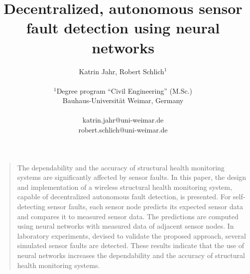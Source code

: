 \documentclass[12pt]{article}
\title{\textbf{ \Large{Decentralized, autonomous sensor fault detection using neural networks}} }
\author
{Katrin Jahr, Robert Schlich$^{1}$\\
\\
\normalsize{$^{1}$Degree program “Civil Engineering” (M.Sc.)}\\
\normalsize{Bauhaus-Universität Weimar, Germany}\\
\\
\normalsize{katrin.jahr@uni-weimar.de}\\
\normalsize{robert.schlich@uni-weimar.de}
}
\date{}
\newenvironment{sciabstract}{%
\begin{quote} \bf}
{\end{quote}}
\begin{document}
 


\baselineskip24pt


\maketitle 




\begin{sciabstract}


The dependability and the accuracy of structural health monitoring systems are significantly affected by sensor faults. 
In this paper, the design and implementation of a wireless structural health monitoring system, capable of decentralized autonomous fault detection, is presented. 
For self-detecting sensor faults, each sensor node predicts its expected sensor data and compares it to measured sensor data. 
The predictions are computed using neural networks with measured data of adjacent sensor nodes.
In laboratory experiments, devised to validate the proposed approach, several simulated sensor faults are detected.
These results indicate that the use of neural networks increases the dependability and the accuracy of structural health monitoring systems.





\end{sciabstract}
\end{document}
